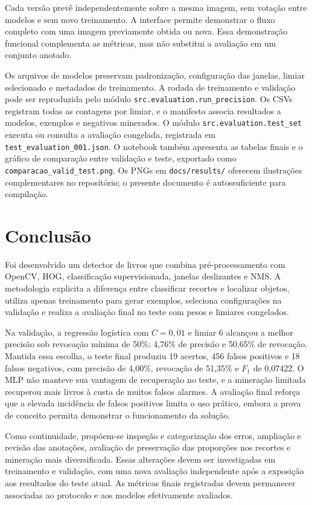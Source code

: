 \documentclass[12pt,a4paper,twocolumn]{article}
\begin{document}
Cada versão prevê independentemente sobre a mesma imagem, sem votação entre modelos e sem novo treinamento. A interface permite demonstrar o fluxo completo com uma imagem previamente obtida ou nova. Essa demonstração funcional complementa as métricas, mas não substitui a avaliação em um conjunto anotado.

Os arquivos de modelos preservam padronização, configuração das janelas, limiar selecionado e metadados de treinamento. A rodada de treinamento e validação pode ser reproduzida pelo módulo \texttt{src.evaluation.run\_precision}. Os CSVs registram todas as contagens por limiar, e o manifesto associa resultados a modelos, exemplos e negativos minerados. O módulo \texttt{src.evaluation.test\_set} executa ou consulta a avaliação congelada, registrada em \texttt{test\_evaluation\_001.json}. O notebook também apresenta as tabelas finais e o gráfico de comparação entre validação e teste, exportado como \texttt{comparacao\_valid\_test.png}. Os PNGs em \texttt{docs/results/} oferecem ilustrações complementares no repositório; o presente documento é autossuficiente para compilação.

\section{Conclusão}
Foi desenvolvido um detector de livros que combina pré-processamento com OpenCV, HOG, classificação supervisionada, janelas deslizantes e NMS. A metodologia explicita a diferença entre classificar recortes e localizar objetos, utiliza apenas treinamento para gerar exemplos, seleciona configurações na validação e realiza a avaliação final no teste com pesos e limiares congelados.

Na validação, a regressão logística com $C=0{,}01$ e limiar 6 alcançou a melhor precisão sob revocação mínima de 50\%: 4,76\% de precisão e 50,65\% de revocação. Mantida essa escolha, o teste final produziu 19 acertos, 456 falsos positivos e 18 falsos negativos, com precisão de 4,00\%, revocação de 51,35\% e $F_1$ de 0,07422. O MLP não manteve sua vantagem de recuperação no teste, e a mineração limitada recuperou mais livros à custa de muitos falsos alarmes. A avaliação final reforça que a elevada incidência de falsos positivos limita o uso prático, embora a prova de conceito permita demonstrar o funcionamento da solução.

Como continuidade, propõem-se inspeção e categorização dos erros, ampliação e revisão das anotações, avaliação de preservação das proporções nos recortes e mineração mais diversificada. Essas alterações devem ser investigadas em treinamento e validação, com uma nova avaliação independente após a exposição aos resultados do teste atual. As métricas finais registradas devem permanecer associadas ao protocolo e aos modelos efetivamente avaliados.
\end{document}
